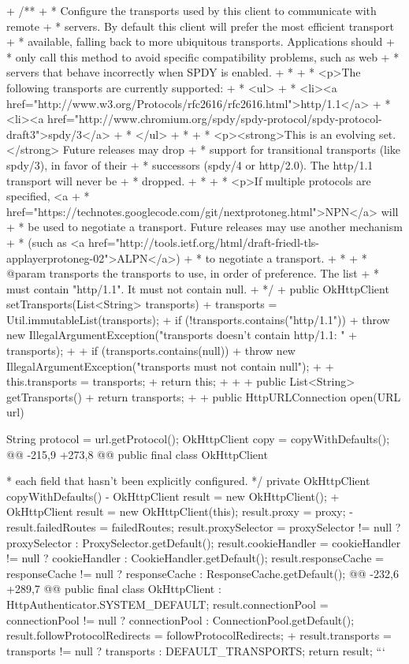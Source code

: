 \begin{prompt}
{{{{+  /**
+   * Configure the transports used by this client to communicate with remote
+   * servers. By default this client will prefer the most efficient transport
+   * available, falling back to more ubiquitous transports. Applications should
+   * only call this method to avoid specific compatibility problems, such as web
+   * servers that behave incorrectly when SPDY is enabled.
+   *
+   * <p>The following transports are currently supported:
+   * <ul>
+   *   <li><a href="http://www.w3.org/Protocols/rfc2616/rfc2616.html">http/1.1</a>
+   *   <li><a href="http://www.chromium.org/spdy/spdy-protocol/spdy-protocol-draft3">spdy/3</a>
+   * </ul>
+   *
+   * <p><strong>This is an evolving set.</strong> Future releases may drop
+   * support for transitional transports (like spdy/3), in favor of their
+   * successors (spdy/4 or http/2.0). The http/1.1 transport will never be
+   * dropped.
+   *
+   * <p>If multiple protocols are specified, <a
+   * href="https://technotes.googlecode.com/git/nextprotoneg.html">NPN</a> will
+   * be used to negotiate a transport. Future releases may use another mechanism
+   * (such as <a href="http://tools.ietf.org/html/draft-friedl-tls-applayerprotoneg-02">ALPN</a>)
+   * to negotiate a transport.
+   *
+   * @param transports the transports to use, in order of preference. The list
+   *     must contain "http/1.1". It must not contain null.
+   */
+  public OkHttpClient setTransports(List<String> transports) {
+    transports = Util.immutableList(transports);
+    if (!transports.contains("http/1.1")) {
+      throw new IllegalArgumentException("transports doesn't contain http/1.1: " + transports);
+    }
+    if (transports.contains(null)) {
+      throw new IllegalArgumentException("transports must not contain null");
+    }
+    this.transports = transports;
+    return this;
+  }
+
+  public List<String> getTransports() {
+    return transports;
+  }
+
   public HttpURLConnection open(URL url) {
     String protocol = url.getProtocol();
     OkHttpClient copy = copyWithDefaults();
@@ -215,9 +273,8 @@ public final class OkHttpClient {
    * each field that hasn't been explicitly configured.
    */
   private OkHttpClient copyWithDefaults() {
-    OkHttpClient result = new OkHttpClient();
+    OkHttpClient result = new OkHttpClient(this);
     result.proxy = proxy;
-    result.failedRoutes = failedRoutes;
     result.proxySelector = proxySelector != null ? proxySelector : ProxySelector.getDefault();
     result.cookieHandler = cookieHandler != null ? cookieHandler : CookieHandler.getDefault();
     result.responseCache = responseCache != null ? responseCache : ResponseCache.getDefault();
@@ -232,6 +289,7 @@ public final class OkHttpClient {
         : HttpAuthenticator.SYSTEM_DEFAULT;
     result.connectionPool = connectionPool != null ? connectionPool : ConnectionPool.getDefault();
     result.followProtocolRedirects = followProtocolRedirects;
+    result.transports = transports != null ? transports : DEFAULT_TRANSPORTS;
     return result;
   }
 }
```

}}}}}}
\end{prompt}
